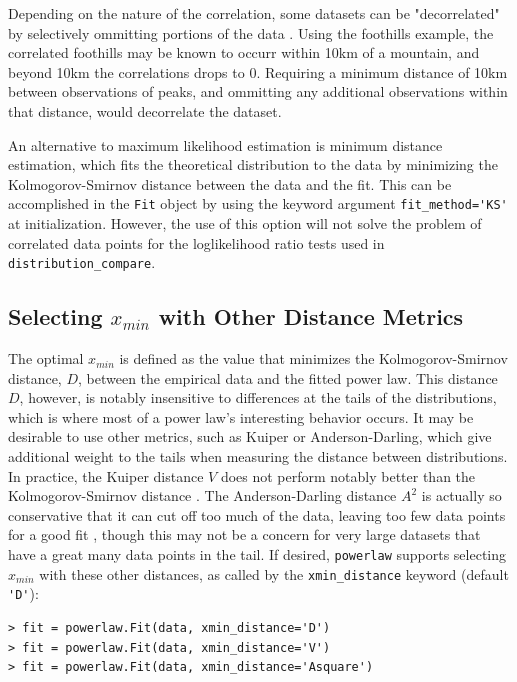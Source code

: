 \documentclass[10pt]{article}
\begin{document}
 Depending on the nature of the correlation, some datasets can be "decorrelated" by selectively ommitting portions of the data \cite{Klaus2011}. Using the foothills example, the correlated foothills may be known to occurr within 10km of a mountain, and beyond 10km the correlations drops to 0. Requiring a minimum distance of 10km between observations of peaks, and ommitting any additional observations within that distance, would decorrelate the dataset. 
 
 An alternative to maximum likelihood estimation is minimum distance estimation, which fits the theoretical distribution to the data by minimizing the Kolmogorov-Smirnov distance between the data and the fit. This can be accomplished in the \verb$Fit$ object by using the keyword argument \verb$fit_method='KS'$ at initialization. However, the use of this option will not solve the problem of correlated data points for the loglikelihood ratio tests used in \verb$distribution_compare$.
 
\subsection*{Selecting $x_{min}$ with Other Distance Metrics}
The optimal $x_{min}$ is defined as the value that minimizes the Kolmogorov-Smirnov distance, $D$, between the empirical data and the fitted power law. This distance $D$, however, is notably insensitive to differences at the tails of the distributions, which is where most of a power law's interesting behavior occurs. It may be desirable to use other metrics, such as Kuiper or Anderson-Darling, which give additional weight to the tails when measuring the distance between distributions. In practice, the Kuiper distance $V$ does not perform notably better than the Kolmogorov-Smirnov distance \cite{Clauset2009}. The Anderson-Darling distance $A^{2}$ is actually so conservative that it can cut off too much of the data, leaving too few data points for a good fit \cite{Clauset2009}, though this may not be a concern for very large datasets that have a great many data points in the tail. If desired, \verb$powerlaw$ supports selecting $x_{min}$ with these other distances, as called by the \verb$xmin_distance$ keyword (default \verb$'D'$):

\begin{verbatim}
> fit = powerlaw.Fit(data, xmin_distance='D')
> fit = powerlaw.Fit(data, xmin_distance='V')
> fit = powerlaw.Fit(data, xmin_distance='Asquare')
\end{verbatim}
\end{document}
